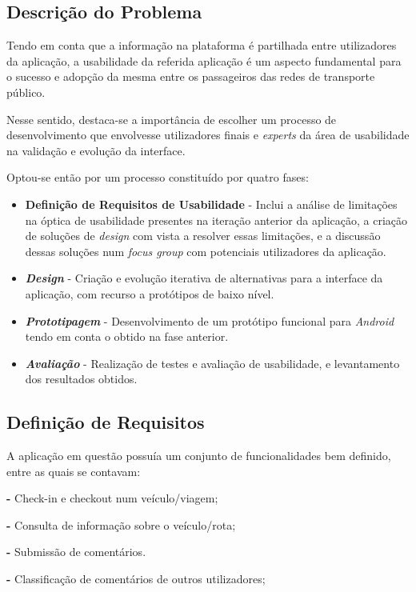 \documentclass[9pt,a4paper]{extarticle}
\begin{document}
\begin{multicols}{2}
\section{Descrição do Problema}\label{sec:work}

Tendo em conta que a informação na plataforma é partilhada entre utilizadores da aplicação, a usabilidade da referida aplicação é um aspecto fundamental para o sucesso e adopção da mesma entre os passageiros das redes de transporte público.

Nesse sentido, destaca-se a importância de escolher um processo de desenvolvimento que envolvesse utilizadores finais e \emph{experts} da área de usabilidade na validação e evolução da interface.

Optou-se então por um processo constituído por quatro fases:
\begin{itemize}
\item \textbf{Definição de Requisitos de Usabilidade} - Inclui a análise de limitações na óptica de usabilidade presentes na iteração anterior da aplicação, a criação de soluções de \emph{design} com vista a resolver essas limitações, e a discussão dessas soluções num \emph{focus group} com potenciais utilizadores da aplicação.
\item \textbf{\emph{Design}} - Criação e evolução iterativa de alternativas para a interface da aplicação, com recurso a protótipos de baixo nível.
\item \textbf{\emph{Prototipagem}} - Desenvolvimento de um protótipo funcional para \emph{Android} tendo em conta o obtido na fase anterior.
\item \textbf{\emph{Avaliação}} - Realização de testes e avaliação de usabilidade, e levantamento dos resultados obtidos.
\end{itemize}


\subsection{Definição de Requisitos}\label{sec:req}

A aplicação em questão possuía um conjunto de funcionalidades bem definido, entre as quais se contavam:

\textbf{-} Check-in e checkout num veículo/viagem;

\textbf{-} Consulta de informação sobre o veículo/rota;

\textbf{-} Submissão de comentários.

\textbf{-} Classificação de comentários de outros utilizadores;


\end{multicols}
\end{document}
